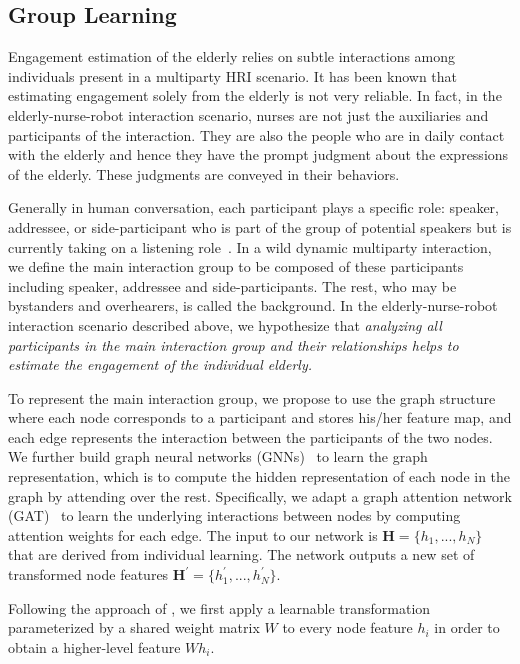 \documentclass[VANCOUVER,STIX1COL]{WileyNJD-v2}
\begin{document}
\subsection{Group Learning}
\label{subs:Group_Learning}

Engagement estimation of the elderly relies on subtle interactions among individuals present in a multiparty HRI scenario. It has been known that estimating engagement solely from the elderly is not very reliable. In fact, in the elderly-nurse-robot interaction scenario, nurses are not just the auxiliaries and participants of the interaction. They are also the people who are in daily contact with the elderly and hence they have the prompt judgment about the expressions of the elderly. These judgments are conveyed in their behaviors.

Generally in human conversation, each participant plays a specific role: speaker, addressee, or side-participant who is part of the group of potential speakers but is currently taking on a listening role~\cite{Goffman1981Forms,Clark1996Using}. In a wild dynamic multiparty interaction, we define the main interaction group to be composed of these participants including speaker, addressee and side-participants. The rest, who may be bystanders and overhearers, is called the background.
In the elderly-nurse-robot interaction scenario described above, we hypothesize that \textit{analyzing all participants in the main interaction group and their relationships helps to estimate the engagement of the individual elderly.}

To represent the main interaction group, we propose to use the graph structure where each node corresponds to a participant and stores his/her feature map, and each edge represents the interaction between the participants of the two nodes. We further build graph neural networks (GNNs)~\cite{Scarselli2008Graph} to learn the graph representation, which is to compute the hidden representation of each node in the graph by attending over the rest. Specifically, we adapt a graph attention network (GAT)~\cite{Velivckovic2017Graph} to learn the underlying interactions between nodes by computing attention weights for each edge. The input to our network is $\mathbf{H} = \{h_1, ..., h_N\}$ that are derived from individual learning. The network outputs a new set of transformed node features $\mathbf{H}^{\prime} = \{h_1^{\prime}, ..., h_N^{\prime}\}$.

Following the approach of \cite{Velivckovic2017Graph}, we first apply a learnable transformation parameterized by a shared weight matrix $W$ to every node feature $h_i$ in order to obtain a higher-level feature $W h_i$.
\end{document}
